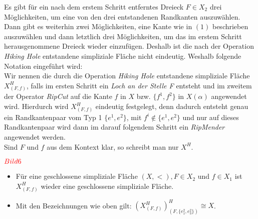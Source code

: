 \documentclass[12pt,titlepage]{article}
\begin{document}

\begin{bemerkung}
Es gibt für ein nach dem erstem Schritt entferntes Dreieck $F \in X_{2}$ drei Möglichkeiten, um eine von den drei entstandenen Randkanten auszuwählen. Dann gibt es weiterhin zwei Möglichkeiten, eine Kante wie in $(1)$ beschrieben auszuwählen und dann letztlich drei Möglichkeiten, um das im erstem Schritt herausgenommene Dreieck wieder einzufügen. Deshalb ist die nach der Operation \emph{Hiking Hole} entstandene simpliziale Fläche nicht eindeutig. Weshalb folgende Notation eingeführt wird: \\
Wir nennen die durch die Operation \emph{Hiking Hole} entstandene simpliziale Fläche $X^{H}_{(F,f)}$, falls im ersten Schritt ein \emph{Loch an der Stelle F} entsteht und im zweitem der Operator \emph{RipCut} auf die Kante $f$ in $X$ bzw. $\{f^1,f^2\}$ in $X(\alpha)$ angewendet wird. Hierdurch wird $X^{H}_{(F,f)}$ eindeutig festgelegt, denn dadurch entsteht genau ein Randkantenpaar vom Typ 1 $\{e^1,e^2\}$, mit $f^i \notin \{e^1,e^2\}$ und nur auf dieses Randkantenpaar wird dann im darauf folgendem Schritt ein \emph{RipMender} angewendet werden.\\ Sind $F$ und $f$ aus dem Kontext klar, so schreibt man nur $X^H$.
\end{bemerkung}
\centerline{$\textcolor{red}{Bild 6}$}
\begin{bemerkung}
\begin{itemize}
\item Für eine geschlossene simpliziale Fläche $(X,<),F \in X_2$ und $f \in X_1$ ist $X^H_{(F,f)}$ wieder eine geschlossene simpliziale Fläche.
\item Mit den Bezeichnungen wie oben gilt: $(X^H_{(F,f)})^H_{(F,\{e_1^2,e_3^2\})}\cong X$.
\end{itemize}
\end{bemerkung}
\end{document}
